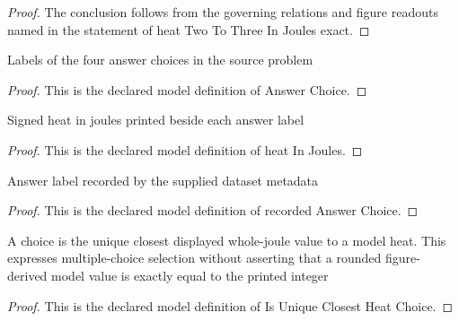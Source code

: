 \begin{proof}
  The conclusion follows from the governing relations and figure readouts named in the statement of heat Two To Three In Joules exact.
\end{proof}
\begin{definition}
  \label{def:physics:phyx-mini-0415:phyxminiproblems-problemphyxmini0415-answerchoice}
  Labels of the four answer choices in the source problem
\end{definition}
\begin{proof}
  This is the declared model definition of Answer Choice.
\end{proof}
\begin{definition}
  \label{def:physics:phyx-mini-0415:phyxminiproblems-problemphyxmini0415-answerchoice-heatinjoules}
  Signed heat in joules printed beside each answer label
\end{definition}
\begin{proof}
  This is the declared model definition of heat In Joules.
\end{proof}
\begin{definition}
  \label{def:physics:phyx-mini-0415:phyxminiproblems-problemphyxmini0415-recordedanswerchoice}
  Answer label recorded by the supplied dataset metadata
\end{definition}
\begin{proof}
  This is the declared model definition of recorded Answer Choice.
\end{proof}
\begin{definition}
  \label{def:physics:phyx-mini-0415:phyxminiproblems-problemphyxmini0415-isuniqueclosestheatchoice}
  A choice is the unique closest displayed whole-joule value to a model heat. This expresses multiple-choice selection without asserting that a rounded figure-derived model value is exactly equal to the printed integer
\end{definition}
\begin{proof}
  This is the declared model definition of Is Unique Closest Heat Choice.
\end{proof}
